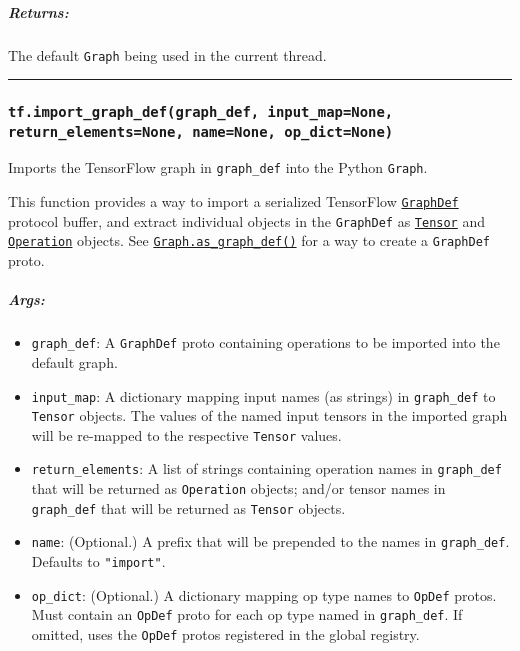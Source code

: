 \subparagraph{Returns: }\label{returns-28}

The default \lstinline{Graph} being used in the current thread.

\begin{center}\rule{0.5\linewidth}{\linethickness}\end{center}

\subsubsection{\texorpdfstring{\lstinline{tf.import_graph_def(graph_def, input_map=None, return_elements=None, name=None, op_dict=None)}
}{tf.import_graph_def(graph_def, input_map=None, return_elements=None, name=None, op_dict=None) }}\label{tf.importux5fgraphux5fdefgraphux5fdef-inputux5fmapnone-returnux5felementsnone-namenone-opux5fdictnone}

Imports the TensorFlow graph in \lstinline{graph_def} into the Python
\lstinline{Graph}.

This function provides a way to import a serialized TensorFlow
\href{https://tensorflow.googlesource.com/tensorflow/+/master/tensorflow/core/framework/graph.proto}{\lstinline{GraphDef}}
protocol buffer, and extract individual objects in the \lstinline{GraphDef}
as \protect\hyperlink{Tensor}{\lstinline{Tensor}} and
\protect\hyperlink{Operation}{\lstinline{Operation}} objects. See
\protect\hyperlink{Graph.asux5fgraphux5fdef}{\lstinline{Graph.as_graph_def()}}
for a way to create a \lstinline{GraphDef} proto.

\subparagraph{Args: }\label{args-25}

\begin{itemize}
\tightlist
\item
  \lstinline{graph_def}: A \lstinline{GraphDef} proto containing operations
  to be imported into the default graph.
\item
  \lstinline{input_map}: A dictionary mapping input names (as strings) in
  \lstinline{graph_def} to \lstinline{Tensor} objects. The values of the
  named input tensors in the imported graph will be re-mapped to the
  respective \lstinline{Tensor} values.
\item
  \lstinline{return_elements}: A list of strings containing operation
  names in \lstinline{graph_def} that will be returned as
  \lstinline{Operation} objects; and/or tensor names in \lstinline{graph_def}
  that will be returned as \lstinline{Tensor} objects.
\item
  \lstinline{name}: (Optional.) A prefix that will be prepended to the
  names in \lstinline{graph_def}. Defaults to \lstinline{"import"}.
\item
  \lstinline{op_dict}: (Optional.) A dictionary mapping op type names to
  \lstinline{OpDef} protos. Must contain an \lstinline{OpDef} proto for each
  op type named in \lstinline{graph_def}. If omitted, uses the
  \lstinline{OpDef} protos registered in the global registry.
\end{itemize}

